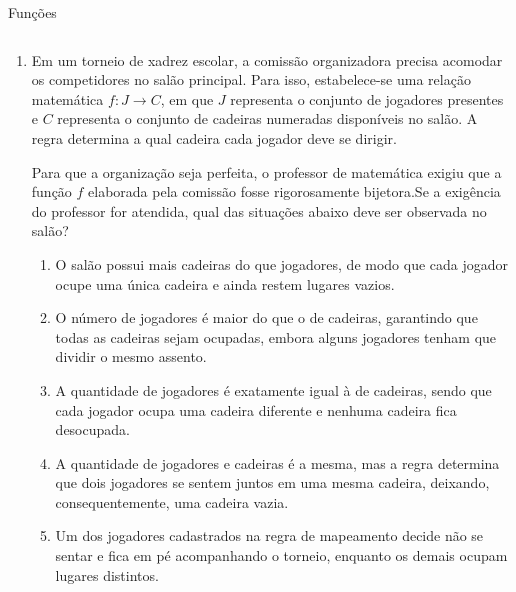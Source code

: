 \documentclass[aspectratio=169, t, 8pt]{beamer}
\newcounter{questaovest}
\newcommand{\vest}{\stepcounter{questaovest}\item[\textbf{Questão \arabic{questaovest}}:]}
\begin{document}
    \begin{frame}{Funções}
        \begin{columns}[totalwidth=.9\textwidth]
            \begin{column}{\textwidth}
                \begin{enumerate}
                    \vest Em um torneio de xadrez escolar, a comissão organizadora precisa acomodar os competidores no salão principal. Para isso, estabelece-se uma relação matemática $f: J \rightarrow C$, em que $J$ representa o conjunto de jogadores presentes e $C$ representa o conjunto de cadeiras numeradas disponíveis no salão. A regra determina a qual cadeira cada jogador deve se dirigir.
                    
                    \vspace{0.2em}

                    Para que a organização seja perfeita, o professor de matemática exigiu que a função $f$ elaborada pela comissão fosse rigorosamente bijetora.Se a exigência do professor for atendida, qual das situações abaixo deve ser observada no salão?

                    \begin{enumerate}
                        \item O salão possui mais cadeiras do que jogadores, de modo que cada jogador ocupe uma única cadeira e ainda restem lugares vazios.
                        \item O número de jogadores é maior do que o de cadeiras, garantindo que todas as cadeiras sejam ocupadas, embora alguns jogadores tenham que dividir o mesmo assento.
                        \item A quantidade de jogadores é exatamente igual à de cadeiras, sendo que cada jogador ocupa uma cadeira diferente e nenhuma cadeira fica desocupada.
                        \item A quantidade de jogadores e cadeiras é a mesma, mas a regra determina que dois jogadores se sentem juntos em uma mesma cadeira, deixando, consequentemente, uma cadeira vazia.
                        \item Um dos jogadores cadastrados na regra de mapeamento decide não se sentar e fica em pé acompanhando o torneio, enquanto os demais ocupam lugares distintos.
                    \end{enumerate}
                \end{enumerate}
            \end{column}
        \end{columns}
    \end{frame}
    
\end{document}
